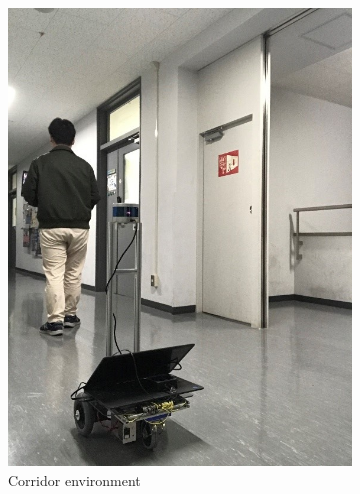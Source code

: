 \begin{figure}[!htb]
    \begin{subfigure}{.5\linewidth}
        \centering
        \includegraphics[scale=0.34,angle = -90]{figures/chap4_fig/Platform/corridor_env.jpg}
        \caption{Corridor environment}
        \label{chap4:fig4:sub1}
    \end{subfigure}%
    \begin{subfigure}{.5\linewidth}
        \centering

\end{subfigure}
\end{figure}
